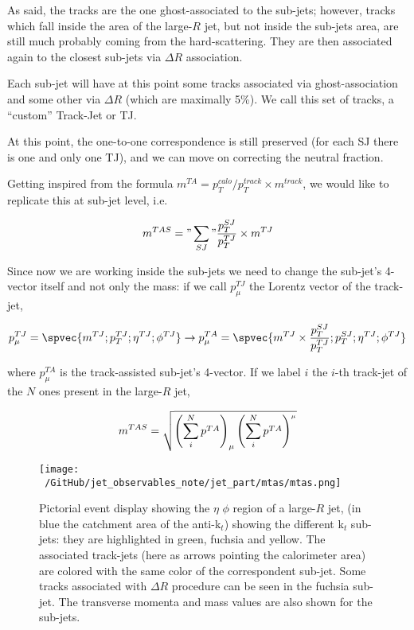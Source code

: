 As said, the tracks are the one ghost-associated to the sub-jets; however, tracks which fall inside the area of the large-$R$ jet, but not inside the sub-jets area, are still much probably coming from the hard-scattering. They are then associated again to the closest sub-jets via $\Delta R$ association.

Each sub-jet will have at this point some tracks associated via ghost-association and some other via $\Delta R$ (which are maximally 5\%). We call this set of tracks, a ``custom'' Track-Jet or TJ.

At this point, the one-to-one correspondence is still preserved (for each SJ there is one and only one TJ), and we can move on correcting the neutral fraction.

Getting inspired from the formula $m^{TA}=p_T^{calo}/p_T^{track}\times m^{track}$, we would like to replicate this at sub-jet level, i.e.

$$m^{TAS}="\sum_{SJ}"\frac{p_T^{SJ}}{p_T^{TJ}}\times m^{TJ}$$

Since now we are working inside the sub-jets we need to change the sub-jet's 4-vector itself and not only the mass: if we call $p_\mu^{TJ}$ the Lorentz vector of the track-jet, 

$$p_\mu^{TJ} = \spvec{m^{TJ};p_T^{TJ};\eta^{TJ};\phi^{TJ}} \to p_\mu^{TA}=\spvec{m^{TJ}\times\frac{p_T^{SJ}}{p_T^{TJ}} ;p_T^{SJ};\eta^{TJ};\phi^{TJ}} $$
 
where $p_\mu^{TA}$ is the track-assisted sub-jet's 4-vector. If we label $i$ the $i$-th track-jet of the $N$ ones present in the large-$R$ jet,

$$ m^{TAS}=\sqrt{\left(\sum_i^N p^{TA} \right)_\mu \left(\sum_i^N p^{TA} \right)^{_\mu}} $$
 
\begin{figure}[!ht]
  \centering
      \texttt{[image: ~/GitHub/jet\_observables\_note/jet\_part/mtas/mtas.png]}
  \caption[Pictorial event display]{Pictorial event display showing the $\eta$ $\phi$ region of a large-$R$ jet, (in blue the catchment area of the anti-k$_t$) showing the different k$_t$ sub-jets: they are highlighted in green, fuchsia and yellow. The associated track-jets (here as arrows pointing the calorimeter area) are colored with the same color of the correspondent sub-jet. Some tracks associated with $\Delta R$ procedure can be seen in the fuchsia sub-jet. The transverse momenta and mass values are also shown for the sub-jets.}
  \label{fig:mtas1}
\end{figure}

